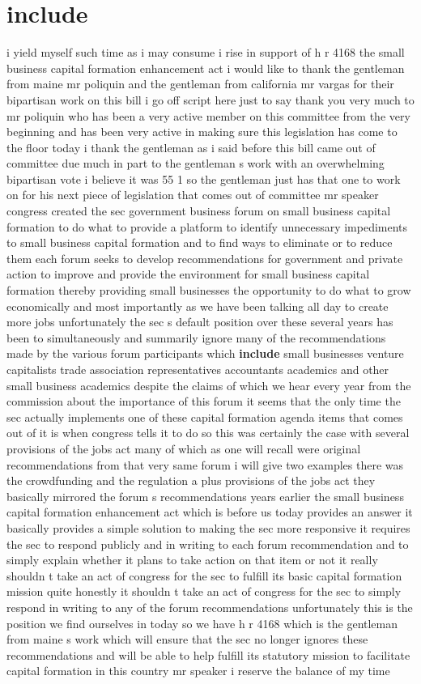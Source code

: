 \documentclass{article}
\begin{document}
\section*{include}
i yield myself such time as i may consume i rise in support of h r 4168 the small business capital formation enhancement act i would like to thank the gentleman from maine mr poliquin and the gentleman from california mr vargas for their bipartisan work on this bill i go off script here just to say thank you very much to mr poliquin who has been a very active member on this committee from the very beginning and has been very active in making sure this legislation has come to the floor today i thank the gentleman as i said before this bill came out of committee due much in part to the gentleman s work with an overwhelming bipartisan vote i believe it was 55 1 so the gentleman just has that one to work on for his next piece of legislation that comes out of committee mr speaker congress created the sec government business forum on small business capital formation to do what to provide a platform to identify unnecessary impediments to small business capital formation and to find ways to eliminate or to reduce them each forum seeks to develop recommendations for government and private action to improve and provide the environment for small business capital formation thereby providing small businesses the opportunity to do what to grow economically and most importantly as we have been talking all day to create more jobs unfortunately the sec s default position over these several years has been to simultaneously and summarily ignore many of the recommendations made by the various forum participants which {\bf \color{red} include} small businesses venture capitalists trade association representatives accountants academics and other small business academics despite the claims of which we hear every year from the commission about the importance of this forum it seems that the only time the sec actually implements one of these capital formation agenda items that comes out of it is when congress tells it to do so this was certainly the case with several provisions of the jobs act many of which as one will recall were original recommendations from that very same forum i will give two examples there was the crowdfunding and the regulation a plus provisions of the jobs act they basically mirrored the forum s recommendations years earlier the small business capital formation enhancement act which is before us today provides an answer it basically provides a simple solution to making the sec more responsive it requires the sec to respond publicly and in writing to each forum recommendation and to simply explain whether it plans to take action on that item or not it really shouldn t take an act of congress for the sec to fulfill its basic capital formation mission quite honestly it shouldn t take an act of congress for the sec to simply respond in writing to any of the forum recommendations unfortunately this is the position we find ourselves in today so we have h r 4168 which is the gentleman from maine s work which will ensure that the sec no longer ignores these recommendations and will be able to help fulfill its statutory mission to facilitate capital formation in this country mr speaker i reserve the balance of my time
\end{document}
